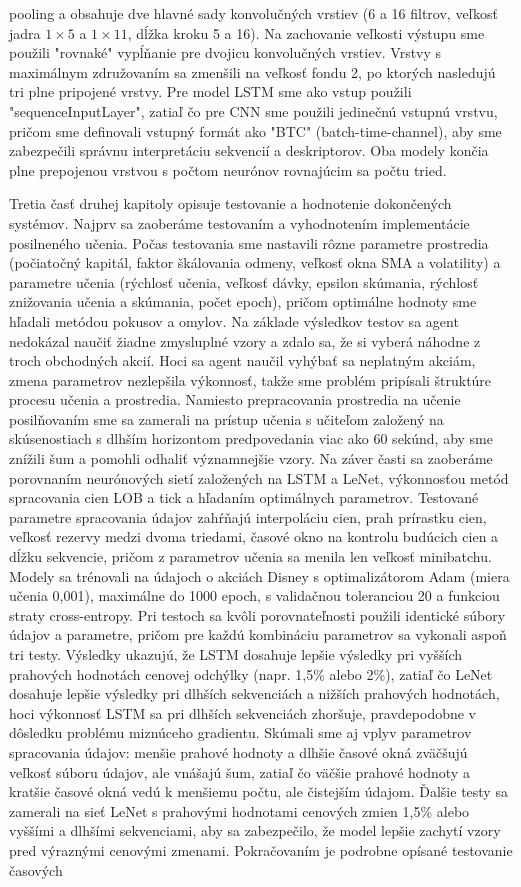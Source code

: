 \documentclass[a4paper,oneside,onecolumn,12pt]{book}
\begin{document}
pooling a obsahuje dve hlavné sady konvolučných vrstiev (6 a 16 filtrov, veľkosť jadra $1\times5$ a $1\times11$, dĺžka kroku 5 a 16). Na zachovanie veľkosti výstupu sme použili "rovnaké" vypĺňanie pre dvojicu konvolučných vrstiev. Vrstvy s maximálnym združovaním sa zmenšili na veľkosť fondu 2, po ktorých nasledujú tri plne pripojené vrstvy. Pre model LSTM sme ako vstup použili "sequenceInputLayer", zatiaľ čo pre CNN sme použili jedinečnú vstupnú vrstvu, pričom sme definovali vstupný formát ako "BTC" (batch-time-channel), aby sme zabezpečili správnu interpretáciu sekvencií a deskriptorov. Oba modely končia plne prepojenou vrstvou s počtom neurónov rovnajúcim sa počtu tried.

Tretia časť druhej kapitoly opisuje testovanie a hodnotenie dokončených systémov. Najprv sa zaoberáme testovaním a vyhodnotením implementácie posilneného učenia. Počas testovania sme nastavili rôzne parametre prostredia (počiatočný kapitál, faktor škálovania odmeny, veľkosť okna SMA a volatility) a parametre učenia (rýchlosť učenia, veľkosť dávky, epsilon skúmania, rýchlosť znižovania učenia a skúmania, počet epoch), pričom optimálne hodnoty sme hľadali metódou pokusov a omylov. Na základe výsledkov testov sa agent nedokázal naučiť žiadne zmysluplné vzory a zdalo sa, že si vyberá náhodne z troch obchodných akcií. Hoci sa agent naučil vyhýbať sa neplatným akciám, zmena parametrov nezlepšila výkonnosť, takže sme problém pripísali štruktúre procesu učenia a prostredia. Namiesto prepracovania prostredia na učenie posilňovaním sme sa zamerali na prístup učenia s učiteľom založený na skúsenostiach s dlhším horizontom predpovedania viac ako 60 sekúnd, aby sme znížili šum a pomohli odhaliť významnejšie vzory. Na záver časti sa zaoberáme porovnaním neurónových sietí založených na LSTM a LeNet, výkonnosťou metód spracovania cien LOB a tick a hľadaním optimálnych parametrov. Testované parametre spracovania údajov zahŕňajú interpoláciu cien, prah prírastku cien, veľkosť rezervy medzi dvoma triedami, časové okno na kontrolu budúcich cien a dĺžku sekvencie, pričom z parametrov učenia sa menila len veľkosť minibatchu. Modely sa trénovali na údajoch o akciách Disney s optimalizátorom Adam (miera učenia 0,001), maximálne do 1000 epoch, s validačnou toleranciou 20 a funkciou straty cross-entropy. Pri testoch sa kvôli porovnateľnosti použili identické súbory údajov a parametre, pričom pre každú kombináciu parametrov sa vykonali aspoň tri testy. Výsledky ukazujú, že LSTM dosahuje lepšie výsledky pri vyšších prahových hodnotách cenovej odchýlky (napr. 1,5\% alebo 2\%), zatiaľ čo LeNet dosahuje lepšie výsledky pri dlhších sekvenciách a nižších prahových hodnotách, hoci výkonnosť LSTM sa pri dlhších sekvenciách zhoršuje, pravdepodobne v dôsledku problému miznúceho gradientu. Skúmali sme aj vplyv parametrov spracovania údajov: menšie prahové hodnoty a dlhšie časové okná zväčšujú veľkosť súboru údajov, ale vnášajú šum, zatiaľ čo väčšie prahové hodnoty a kratšie časové okná vedú k menšiemu počtu, ale čistejším údajom. Ďalšie testy sa zamerali na sieť LeNet s prahovými hodnotami cenových zmien 1,5\% alebo vyššími a dlhšími sekvenciami, aby sa zabezpečilo, že model lepšie zachytí vzory pred výraznými cenovými zmenami. Pokračovaním je podrobne opísané testovanie časových 
\end{document}
